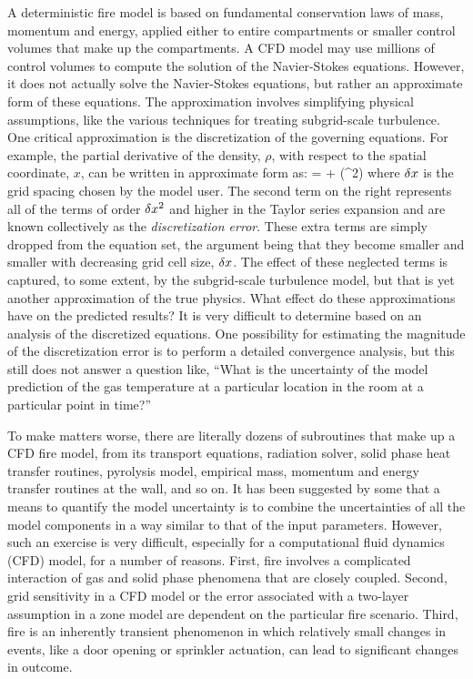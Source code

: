 A deterministic fire model is based on fundamental conservation laws of mass, momentum and energy,
applied either to entire compartments or smaller control
volumes that make up the compartments. A CFD model may use millions of control volumes to compute the
solution of the Navier-Stokes equations.
However, it does not actually solve the Navier-Stokes equations, but rather an approximate form of these equations.
The approximation involves simplifying
physical assumptions, like the various techniques for treating subgrid-scale turbulence.
One critical approximation is the discretization of the governing equations. For example,
the partial derivative of the density, $\rho$,
with respect to the spatial coordinate, $x$, can be written in approximate form as:
\be {} =  + (\dx^2) \ee
where $\delta x$ is the grid spacing chosen by the model user.
The second term on the right represents all of the terms of order $\delta x^2$ and higher in the Taylor
series expansion and are known collectively as the
{\em discretization error}. These extra terms are simply dropped from
the equation set, the argument being that they become smaller and smaller with decreasing grid cell size, $\delta x$.
The effect of these neglected terms is captured, to
some extent, by the subgrid-scale turbulence model, but that is yet another approximation of the true physics.
What effect do these approximations have on
the predicted results? It is very difficult to determine based on an analysis of the discretized equations.
One possibility for estimating
the magnitude of the discretization error is to perform a detailed
convergence analysis, but this still does not answer a
question like, ``What is the uncertainty of the model prediction of the gas
temperature at a particular location in the room at a particular point in time?''

To make matters worse, there are literally dozens of subroutines that make up a CFD fire model,
from its transport equations, radiation solver, solid phase heat transfer routines, pyrolysis model,
empirical mass, momentum and energy transfer routines at the wall, and so on.
It has been suggested by some that
a means to quantify the model uncertainty is to combine the uncertainties of all the model
components in a way similar to that of the input parameters.
However, such an exercise is very difficult, especially for a computational fluid dynamics (CFD) model,
for a number of reasons. First, fire involves
a complicated interaction of gas and solid phase phenomena that are closely coupled.
Second, grid sensitivity in a CFD model or the error associated with
a two-layer assumption in a zone model are dependent on the particular fire scenario.
Third, fire is an inherently transient phenomenon in which relatively small
changes in events, like a door opening or sprinkler actuation, can lead to significant changes in outcome.


